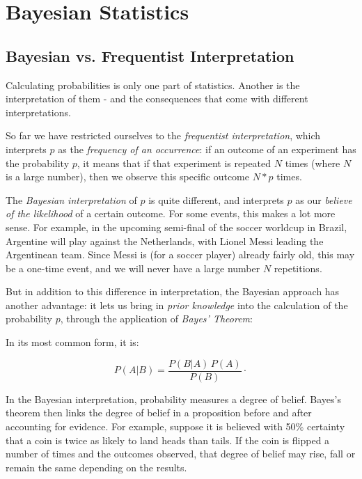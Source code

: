 \chapter{Bayesian Statistics}\label{chapter:Bayes}

\section{Bayesian vs. Frequentist Interpretation}

Calculating probabilities is only one part of statistics. Another is the interpretation of them - and the consequences that come with different interpretations.

So far we have restricted ourselves to the \emph{frequentist interpretation}, which interprets $p$ as the \emph{frequency of an occurrence}: if an outcome of an experiment has the probability $p$, it means that if that experiment is repeated $N$ times (where $N$ is a large number), then we observe this specific outcome $N*p$ times.

The \emph{Bayesian interpretation} of $p$ is quite different, and interprets $p$ as our \emph{believe of the likelihood} of a certain outcome. For some events, this makes a lot more sense. For example, in the upcoming semi-final of the soccer worldcup in Brazil, Argentine will play against the Netherlands, with Lionel Messi leading the Argentinean team. Since Messi is (for a soccer player) already fairly old, this may be a one-time event, and we will never have a large number $N$ repetitions.

But in addition to this difference in interpretation, the Bayesian approach has another advantage: it lets us bring in \emph{prior knowledge} into the calculation of the probability $p$, through the application of \emph{Bayes' Theorem}:

In its most common form, it is:

\begin{equation}\label{eq:BayesTheorem}
  P(A|B) = \frac{P(B | A)\, P(A)}{P(B)}\cdot
\end{equation}

In the Bayesian interpretation, probability measures a degree of belief. Bayes's theorem then links the degree of belief in a proposition before and after accounting for evidence. For example, suppose it is believed with 50\% certainty that a coin is twice as likely to land heads than tails. If the coin is flipped a number of times and the outcomes observed, that degree of belief may rise, fall or remain the same depending on the results.

